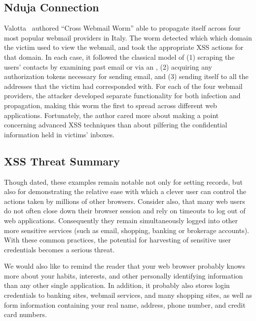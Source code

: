 \subsection{Nduja Connection}
Valotta~\cite{nduja} authored ``Cross Webmail Worm'' able to propagate itself across four most popular webmail providers in Italy.
The worm detected which which domain the victim used to view the webmail, and took the appropriate XSS actions for that domain.
In each case, it followed the classical model of (1) scraping the users' contacts by examining past email or via an , (2) acquiring any authorization tokens necessary for sending email, and (3) sending itself to all the addresses that the victim had corresponded with.
For each of the four webmail providers, the attacker developed separate functionality for both infection and propagation, making this worm the first to spread across different web applications.
Fortunately, the author cared more about making a point concerning advanced XSS techniques than about pilfering the confidential information held in victims' inboxes.

\subsection{XSS Threat Summary}
Though dated, these examples remain notable not only for setting records, but also for demonstrating the relative ease with which a clever user can control the actions taken by millions of other browsers.
Consider also, that many web users do not often close down their browser session and rely on timeouts to log out of web applications.
Consequently they remain simultaneously logged into other more sensitive services (such as email, shopping, banking or brokerage accounts).
With these common practices, the potential for harvesting of sensitive user credentials becomes a serious threat.

We would also like to remind the reader that your web browser probably knows more about your habits, interests, and other personally identifying information than any other single application.
In addition, it probably also stores login credentials to banking sites, webmail services, and many shopping sites, as well as form information containing your real name, address, phone number, and credit card numbers.



